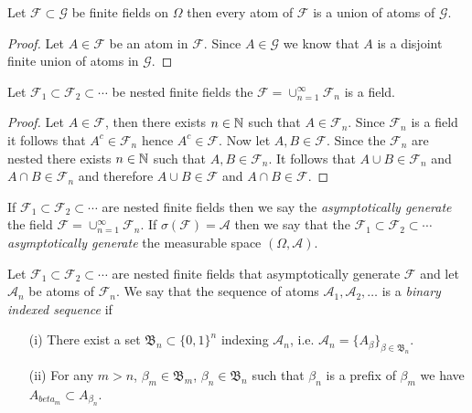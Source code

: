 \begin{cor}\label{RefinementOfAtoms}Let $\mathcal{F} \subset \mathcal{G}$ be finite fields on $\Omega$ then every atom of $\mathcal{F}$ is a union of atoms of $\mathcal{G}$.
\end{cor}
\begin{proof}
Let $A \in \mathcal{F}$ be an atom in $\mathcal{F}$.  Since $A \in \mathcal{G}$ we know that $A$ is a disjoint finite union of atoms in $\mathcal{G}$.  
\end{proof}

\begin{prop}\label{NestedUnionOfFieldsOfSets}Let $\mathcal{F}_1 \subset \mathcal{F}_2 \subset \dotsb$ be nested finite fields the $\mathcal{F} = \cup_{n=1}^\infty \mathcal{F}_n$ is a field.
\end{prop}
\begin{proof}
Let $A \in \mathcal{F}$, then there exists $n \in \mathbb{N}$ such that $A \in \mathcal{F}_n$.   Since $\mathcal{F}_n$ is a field it follows that $A^c \in \mathcal{F}_n$ hence $A^c \in \mathcal{F}$.  Now let $A, B \in \mathcal{F}$.  Since the $\mathcal{F}_n$ are nested there exists $n \in \mathbb{N}$ such that $A,B \in \mathcal{F}_n$.  It follows that $A \cup B \in \mathcal{F}_n$ and $A \cap B \in \mathcal{F}_n$ and therefore $A \cup B \in \mathcal{F}$ and $A \cap B \in \mathcal{F}$.
\end{proof}

\begin{defn}If $\mathcal{F}_1 \subset \mathcal{F}_2 \subset \dotsb$ are nested finite fields then we say the \emph{asymptotically generate} the field $\mathcal{F} = \cup_{n=1}^\infty \mathcal{F}_n$.  If $\sigma(\mathcal{F}) = \mathcal{A}$ then we say that the $\mathcal{F}_1 \subset \mathcal{F}_2 \subset \dotsb$ \emph{asymptotically generate} the measurable space $(\Omega, \mathcal{A})$.
\end{defn}

\begin{defn}Let $\mathcal{F}_1 \subset \mathcal{F}_2 \subset \dotsb$ are nested finite fields that asymptotically generate $\mathcal{F}$ and let $\mathcal{A}_n$ be atoms of $\mathcal{F}_n$.  We say that the sequence of atoms $\mathcal{A}_1, \mathcal{A}_2, \dotsc$ is a \emph{binary indexed sequence} if 
\begin{itemize}
\item[(i)] There exist a set $\mathfrak{B}_n \subset \lbrace 0, 1 \rbrace^n$ indexing $\mathcal{A}_n$, i.e. $\mathcal{A}_n = \lbrace A_\beta \rbrace_{\beta \in \mathfrak{B}_n}$.
\item[(ii)] For any $m > n$, $\beta_m \in \mathfrak{B}_m$, $\beta_n \in \mathfrak{B}_n$ such that $\beta_n$ is a prefix of $\beta_m$ we have $A_{beta_m} \subset A_{\beta_n}$.
\end{itemize}
\end{defn}

